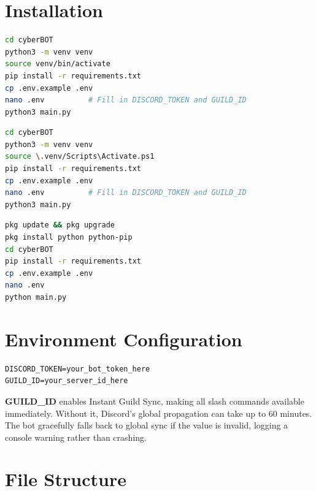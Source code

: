 \documentclass[12pt,a4paper]{report}
\newcommand{\note}[1]{
    \begin{tcolorbox}[colback=cyberblue!5, colframe=cyberblue,
        title=\textbf{NOTE}, fonttitle=\sffamily\small]
    #1
    \end{tcolorbox}
}
\begin{document}
\section{Installation}

\begin{lstlisting}[language=bash, caption=Standard Deployment (Linux / Kali)]
cd cyberBOT
python3 -m venv venv
source venv/bin/activate
pip install -r requirements.txt
cp .env.example .env
nano .env          # Fill in DISCORD_TOKEN and GUILD_ID
python3 main.py
\end{lstlisting}

\begin{lstlisting}[language=bash, caption=Standard Deployment (Windows)]
cd cyberBOT
python3 -m venv venv
source \.venv/Scripts\Activate.ps1
pip install -r requirements.txt
cp .env.example .env
nano .env          # Fill in DISCORD_TOKEN and GUILD_ID
python3 main.py
\end{lstlisting}

\newpage
\begin{lstlisting}[language=bash, caption=Termux (Android) Deployment]
pkg update && pkg upgrade
pkg install python python-pip
cd cyberBOT
pip install -r requirements.txt
cp .env.example .env
nano .env
python main.py
\end{lstlisting}

\section{Environment Configuration}

\begin{tcolorbox}[colback=codebg, colframe=cybergold!60]
\begin{verbatim}
DISCORD_TOKEN=your_bot_token_here
GUILD_ID=your_server_id_here
\end{verbatim}
\end{tcolorbox}

\note{
    \textbf{GUILD\_ID} enables Instant Guild Sync, making all slash commands available immediately.
    Without it, Discord's global propagation can take up to 60 minutes. The bot gracefully falls back
    to global sync if the value is invalid, logging a console warning rather than crashing.
}

\section{File Structure}
\end{document}
